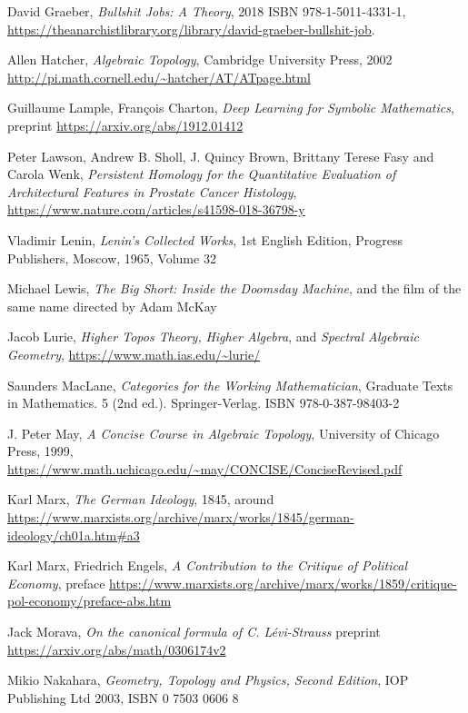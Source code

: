 \documentclass{article}
\begin{document}
\begin{thebibliography}{99}
 David Graeber, \textit{Bullshit Jobs: A Theory}, 2018 ISBN 978-1-5011-4331-1, \url{https://theanarchistlibrary.org/library/david-graeber-bullshit-job}.

 Allen Hatcher, \textit{Algebraic Topology}, Cambridge University Press, 2002 \url{http://pi.math.cornell.edu/~hatcher/AT/ATpage.html}

 Guillaume Lample, Fran\c cois Charton, \textit{Deep Learning for Symbolic Mathematics}, preprint \url{https://arxiv.org/abs/1912.01412}

 Peter Lawson, Andrew B. Sholl, J. Quincy Brown, Brittany Terese Fasy and Carola Wenk, \textit{Persistent Homology for the Quantitative Evaluation of Architectural Features in Prostate Cancer Histology}, \url{https://www.nature.com/articles/s41598-018-36798-y}

 Vladimir Lenin, \textit{Lenin’s Collected Works}, 1st English Edition, Progress Publishers, Moscow, 1965, Volume 32

 Michael Lewis, \textit{The Big Short: Inside the Doomsday Machine}, and the film of the same name directed by Adam McKay

 Jacob Lurie, \textit{Higher Topos Theory,} \textit{Higher Algebra}, and \textit{Spectral Algebraic Geometry}, \url{https://www.math.ias.edu/~lurie/}


 Saunders MacLane, \textit{Categories for the Working Mathematician}, Graduate Texts in Mathematics. 5 (2nd ed.). Springer-Verlag. ISBN 978-0-387-98403-2

 J. Peter May, \textit{A Concise Course in Algebraic Topology}, University of Chicago Press, 1999, \url{https://www.math.uchicago.edu/~may/CONCISE/ConciseRevised.pdf}

 Karl Marx, \textit{The German Ideology}, 1845, around \url{https://www.marxists.org/archive/marx/works/1845/german-ideology/ch01a.htm#a3}

 Karl Marx, Friedrich Engels, \textit{A Contribution to the Critique of Political Economy}, preface \url{https://www.marxists.org/archive/marx/works/1859/critique-pol-economy/preface-abs.htm}

 Jack Morava, \textit{On the canonical formula of C. L\'evi-Strauss} preprint \url{https://arxiv.org/abs/math/0306174v2}

 Mikio Nakahara, \textit{Geometry, Topology and Physics, Second Edition}, IOP Publishing Ltd 2003, ISBN 0 7503 0606 8


\end{thebibliography}
\end{document}
